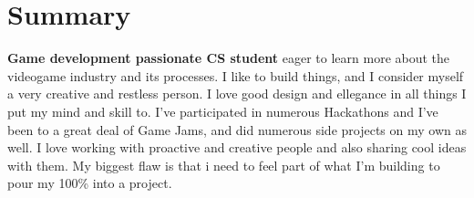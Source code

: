 \section{Summary}

\textbf{Game development passionate CS student} eager to learn more about the videogame industry and its processes. I like to build things, and I consider myself a very creative and restless person. I love good design and ellegance in all things I put my mind and skill to. I've participated in numerous Hackathons and I've been to a great deal of Game Jams, and did numerous side projects on my own as well. I love working with proactive and creative people and also sharing cool ideas with them. My biggest flaw is that i need to feel part of what I'm building to pour my 100\% into a project.
